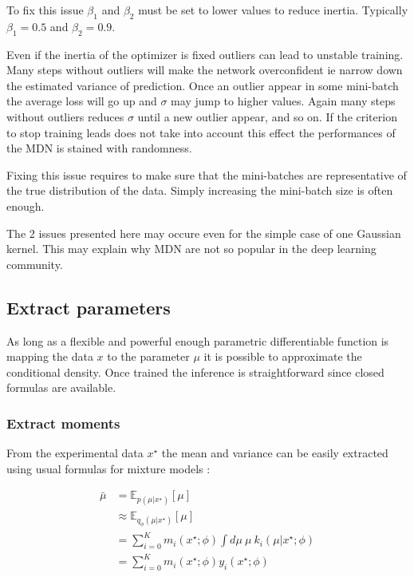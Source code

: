 To fix this issue $\beta_1$ and $\beta_2$ must be set to lower values to reduce inertia.
Typically $\beta_1=0.5$ and $\beta_2=0.9$.


Even if the inertia of the optimizer is fixed outliers can lead to unstable training.
Many steps without outliers will make the network overconfident ie narrow down the estimated variance of prediction.
Once an outlier appear in some mini-batch the average loss will go up and $\sigma$ may jump to higher values.
Again many steps without outliers reduces $\sigma$ until a new outlier appear, and so on.
If the criterion to stop training leads does not take into account this effect the performances of the MDN is stained with randomness.

Fixing this issue requires to make sure that the mini-batches are representative of the true distribution of the data.
Simply increasing the mini-batch size is often enough.

The 2 issues presented here may occure even for the simple case of one Gaussian kernel.
This may explain why MDN are not so popular in the deep learning community.






\subsection{Extract parameters} %
\label{sub:extract_parameters}



As long as a flexible and powerful enough parametric differentiable function is mapping the data $x$ to the parameter $\mu$ it is possible to approximate the conditional density.
Once trained the inference is straightforward since closed formulas are available.


\subsubsection{Extract moments} %
\label{ssub:extract_moments}

From the experimental data $x^\star$ the mean and variance can be easily extracted using usual formulas for mixture models \needcite :

\begin{align}
    \bar \mu & = \mathbb E_{p(\mu | x^\star)}[\mu] \\
    & \approx \mathbb E_{q_\phi(\mu | x^\star)}[\mu] \\
    & = \sum_{i=0}^K m_i(x^\star ; \phi) \int d\mu ~ \mu ~ k_i(\mu | x^\star ; \phi) \\
    \label{eq:extract_mean}& = \sum_{i=0}^K m_i(x^\star ; \phi) y_i(x^\star ; \phi)
\end{align}

